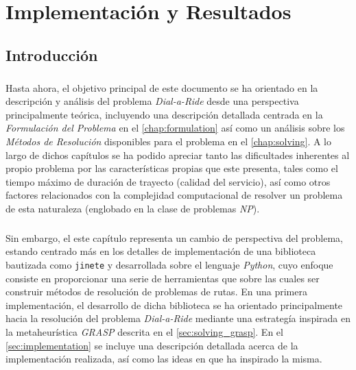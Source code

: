 \documentclass{subfiles}
\begin{document}
  \chapter{Implementación y Resultados}
  \label{chap:implementation_results}

    \section{Introducción}
    \label{sec:implementation_results_introduction}

      \paragraph{}
      Hasta ahora, el objetivo principal de este documento se ha orientado en la descripción y análisis del problema \emph{Dial-a-Ride} desde una perspectiva principalmente teórica, incluyendo una descripción detallada centrada en la \emph{Formulación del Problema} en el \cref{chap:formulation} así como un análisis sobre los \emph{Métodos de Resolución} disponibles para el problema en el \cref{chap:solving}. A lo largo de dichos capítulos se ha podido apreciar tanto las dificultades inherentes al propio problema por las características propias que este presenta, tales como el tiempo máximo de duración de trayecto (calidad del servicio), así como otros factores relacionados con la complejidad computacional de resolver un problema de esta naturaleza (englobado en la clase de problemas \emph{NP}).

      \paragraph{}
      Sin embargo, el este capítulo representa un cambio de perspectiva del problema, estando centrado más en los detalles de implementación de una biblioteca bautizada como \texttt{jinete} y desarrollada sobre el lenguaje \emph{Python}, cuyo enfoque consiste en proporcionar una serie de herramientas que sobre las cuales ser construir métodos de resolución de problemas de rutas. En una primera implementación, el desarrollo de dicha biblioteca se ha orientado principalmente hacia la resolución del problema \emph{Dial-a-Ride} mediante una estrategía inspirada en la metaheurística \emph{GRASP} descrita en el \cref{sec:solving_grasp}. En el \cref{sec:implementation} se incluye una descripción detallada acerca de la implementación realizada, así como las ideas en que ha inspirado la misma.
\end{document}

